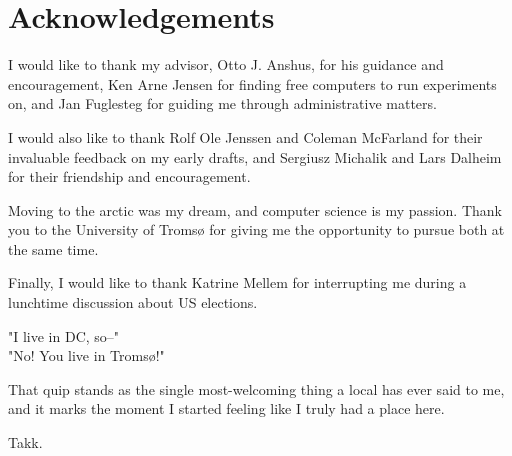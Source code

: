 \chapter{Acknowledgements}

I would like to thank my advisor, Otto J. Anshus, for his guidance and
encouragement, Ken Arne Jensen for finding free computers to run experiments on,
and Jan Fuglesteg for guiding me through administrative matters.

I would also like to thank Rolf Ole Jenssen and Coleman McFarland for their
invaluable feedback on my early drafts, and Sergiusz Michalik and Lars Dalheim
for their friendship and encouragement.

Moving to the arctic was my dream, and computer science is my passion.
Thank you to the University of Tromsø for giving me the opportunity to pursue
both at the same time.

Finally, I would like to thank Katrine Mellem for interrupting me during a
lunchtime discussion about US elections.

"I live in DC, so--"\\
"No! You live in Tromsø!"

That quip stands as the single most-welcoming thing a local has ever said to me,
and it marks the moment I started feeling like I truly had a place here.

Takk.
